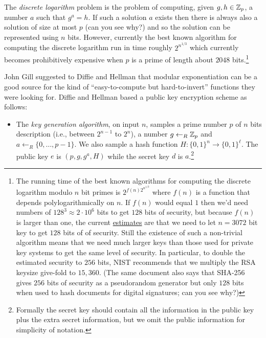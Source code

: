 The \emph{discrete logarithm} problem is the problem of computing, given
\(g,h \in {\mathbb{Z}}_p\), a number \(a\) such that \(g^a=h\). If such a solution
\(a\) exists then there is always also a solution of size at most \(p\)
(can you see why?) and so the solution can be represented using \(n\)
bits. However, currently the best known algorithm for computing the
discrete logarithm run in time roughly \(2^{n^{1/3}}\) which currently
becomes prohibitively expensive when \(p\) is a prime of length about
\(2048\) bits.\footnote{The running time of the best known algorithms
  for computing the discrete logarithm modulo \(n\) bit primes is
  \(2^{f(n)2^{n^{1/3}}}\) where \(f(n)\) is a function that depends
  polylogarithmically on \(n\). If \(f(n)\) would equal \(1\) then we'd
  need numbers of \(128^3 \approx 2\cdot 10^6\) bits to get \(128\) bits
  of security, but because \(f(n)\) is larger than one, the current
  \href{https://goo.gl/ntszsg}{estimates} are that we need to let
  \(n=3072\) bit key to get \(128\) bits of of security. Still the
  existence of such a non-trivial algorithm means that we need much
  larger keys than those used for private key systems to get the same
  level of security. In particular, to double the estimated security to
  \(256\) bits, NIST recommends that we multiply the RSA keysize
  give-fold to \(15,360\). (The same document also says that SHA-256
  gives \(256\) bits of security as a pseudorandom generator but only
  \(128\) bits when used to hash documents for digital signatures; can
  you see why?)}

John Gill suggested to Diffie and Hellman that modular exponentiation
can be a good source for the kind of ``easy-to-compute but
hard-to-invert'' functions they were looking for. Diffie and Hellman
based a public key encryption scheme as follows:

\begin{itemize}
\tightlist
\item
  The \emph{key generation algorithm}, on input \(n\), samples a prime
  number \(p\) of \(n\) bits description (i.e., between \(2^{n-1}\) to
  \(2^n\)), a number \(g\leftarrow_R {\mathbb{Z}}_p\) and
  \(a \leftarrow_R \{0,\ldots,p-1\}\). We also sample a hash function
  \(H:\{0,1\}^n\rightarrow\{0,1\}^\ell\). The public key \(e\) is
  \((p,g,g^a,H)\) while the secret key \(d\) is \(a\).\footnote{Formally
    the secret key should contain all the information in the public key
    plus the extra secret information, but we omit the public
    information for simplicity of notation.}
\end{itemize}

